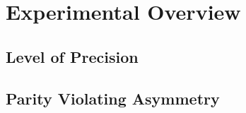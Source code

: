 \section{Experimental Overview}

\subsection{Level of Precision}

\subsection{Parity Violating Asymmetry}